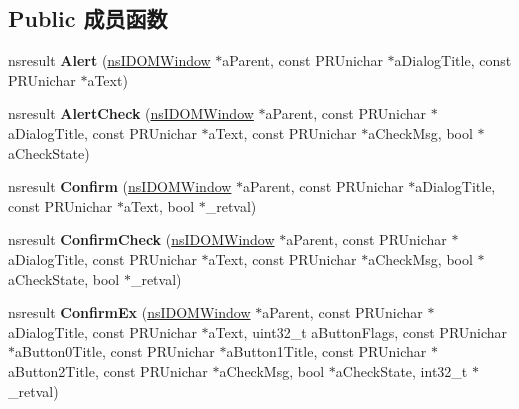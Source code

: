 \subsection*{Public 成员函数}
\begin{DoxyCompactItemize}
\item 
\mbox{\label{interfacens_i_prompt_service_a9adba43c692bdc68a4243684c0968b38}} 
nsresult {\bfseries Alert} (\hyperlink{interfacens_i_d_o_m_window}{ns\+I\+D\+O\+M\+Window} $\ast$a\+Parent, const P\+R\+Unichar $\ast$a\+Dialog\+Title, const P\+R\+Unichar $\ast$a\+Text)
\item 
\mbox{\label{interfacens_i_prompt_service_af9d1c913e95a07f89e7f33fada7bf3d1}} 
nsresult {\bfseries Alert\+Check} (\hyperlink{interfacens_i_d_o_m_window}{ns\+I\+D\+O\+M\+Window} $\ast$a\+Parent, const P\+R\+Unichar $\ast$a\+Dialog\+Title, const P\+R\+Unichar $\ast$a\+Text, const P\+R\+Unichar $\ast$a\+Check\+Msg, bool $\ast$a\+Check\+State)
\item 
\mbox{\label{interfacens_i_prompt_service_a49c4425ad321c1c85e3090701436dc6d}} 
nsresult {\bfseries Confirm} (\hyperlink{interfacens_i_d_o_m_window}{ns\+I\+D\+O\+M\+Window} $\ast$a\+Parent, const P\+R\+Unichar $\ast$a\+Dialog\+Title, const P\+R\+Unichar $\ast$a\+Text, bool $\ast$\+\_\+retval)
\item 
\mbox{\label{interfacens_i_prompt_service_a714789533ab978184fc218f877c6a2c2}} 
nsresult {\bfseries Confirm\+Check} (\hyperlink{interfacens_i_d_o_m_window}{ns\+I\+D\+O\+M\+Window} $\ast$a\+Parent, const P\+R\+Unichar $\ast$a\+Dialog\+Title, const P\+R\+Unichar $\ast$a\+Text, const P\+R\+Unichar $\ast$a\+Check\+Msg, bool $\ast$a\+Check\+State, bool $\ast$\+\_\+retval)
\item 
\mbox{\label{interfacens_i_prompt_service_a27757a5fa89ba29b80cbf9a771b38e69}} 
nsresult {\bfseries Confirm\+Ex} (\hyperlink{interfacens_i_d_o_m_window}{ns\+I\+D\+O\+M\+Window} $\ast$a\+Parent, const P\+R\+Unichar $\ast$a\+Dialog\+Title, const P\+R\+Unichar $\ast$a\+Text, uint32\+\_\+t a\+Button\+Flags, const P\+R\+Unichar $\ast$a\+Button0\+Title, const P\+R\+Unichar $\ast$a\+Button1\+Title, const P\+R\+Unichar $\ast$a\+Button2\+Title, const P\+R\+Unichar $\ast$a\+Check\+Msg, bool $\ast$a\+Check\+State, int32\+\_\+t $\ast$\+\_\+retval)

\end{DoxyCompactItemize}
